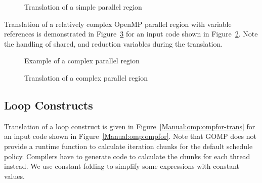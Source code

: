 \begin{figure}[htbp]
{\indent
  {\mySmallFontSize
    \begin{latexonly}
    
    \end{latexonly}
    \begin{htmlonly}
    
    \end{htmlonly}
  }
}
\caption{Translation of a simple parallel region}
\label{Manual:omp:hello1-trans}
\end{figure}

Translation of a relatively complex OpenMP parallel region with variable references is demonstrated in
Figure~\ref{Manual:omp:preduction-trans} for an input code shown in
Figure~\ref{Manual:omp:preduction}. 
Note the handling of shared, and reduction variables during the translation.

\lstset{language=C,basicstyle=\scriptsize}
\begin{figure}[htbp]
{\indent
  {\mySmallFontSize
    \begin{latexonly}
    
    \end{latexonly}
    \begin{htmlonly}
    
    \end{htmlonly}
  }
}
\caption{Example of a complex parallel region}
\label{Manual:omp:preduction}
\end{figure}

\begin{figure}[htbp]
{\indent
  {\mySmallFontSize
    \begin{latexonly}
    
    \end{latexonly}
    \begin{htmlonly}
    
    \end{htmlonly}
  }
}
\caption{Translation of a complex parallel region}
\label{Manual:omp:preduction-trans}
\end{figure}

\clearpage
\subsection{Loop Constructs}
Translation of a loop construct is given in
Figure~\ref{Manual:omp:ompfor-trans} for an input code shown in
Figure~\ref{Manual:omp:ompfor}. 
Note that GOMP does not provide a runtime function to calculate iteration chunks for the default schedule policy. 
Compilers have to generate code to calculate the chunks for each thread instead. 
We use constant folding to simplify some expressions with constant values. 

